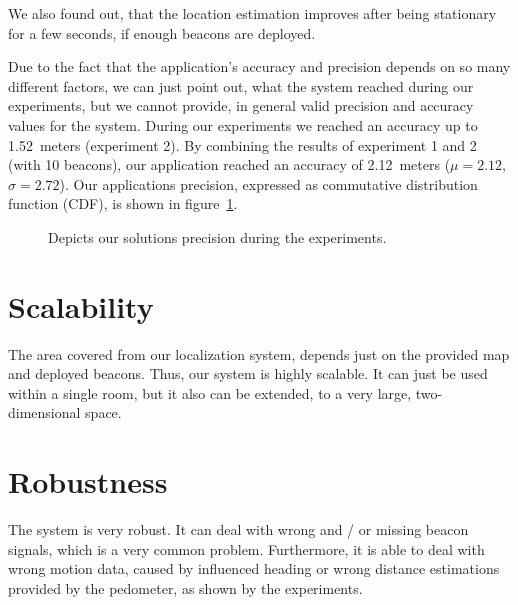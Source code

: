 We also found out, that the location estimation improves after being stationary for a few seconds, if enough beacons are deployed.

Due to the fact that the application's accuracy and precision depends on so many different factors, we can just point out, what the system reached during our experiments, but we cannot provide, in general valid precision and accuracy values for the system. During our experiments we reached an accuracy up to 1.52~meters (experiment 2). By combining the results of experiment 1 and 2 (with 10 beacons), our application reached an accuracy of 2.12~meters ($\mu=2.12$, $\sigma=2.72$). Our applications precision, expressed as commutative distribution function (CDF), is shown in figure~\ref{fig:eval:precision}.



\begin{figure}
\caption{Depicts our solutions precision during the experiments.}
\label{fig:eval:precision}
\end{figure}



\section{Scalability}
The area covered from our localization system, depends just on the provided map and deployed beacons. Thus, our system is highly scalable. It can just be used within a single room, but it also can be extended, to a very large, two-dimensional space.

\section{Robustness}
The system is very robust. It can deal with wrong and / or missing beacon signals, which is a very common problem. Furthermore, it is able to deal with wrong motion data, caused by influenced heading or wrong distance estimations provided by the pedometer, as shown by the experiments.

